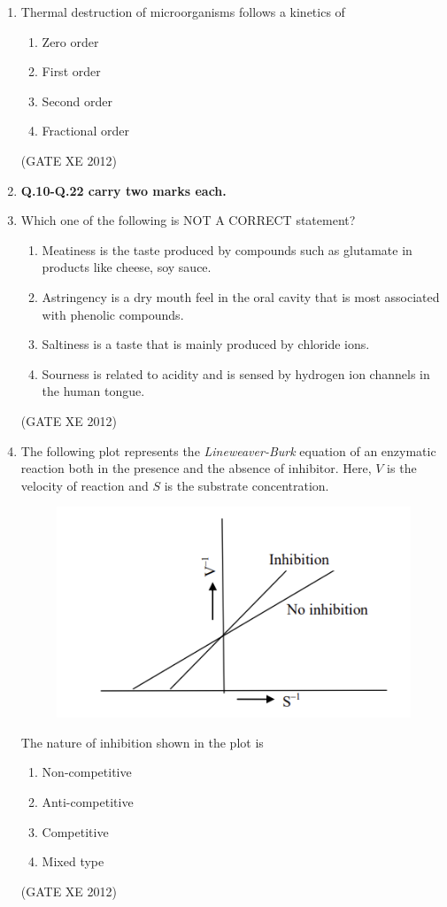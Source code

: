 \documentclass[12pt]{article}
\begin{document}
\begin{enumerate}
  \item Thermal destruction of microorganisms follows a kinetics of
  \begin{enumerate}
    \item Zero order
    \item First order
    \item Second order
    \item Fractional order
  \end{enumerate}
  (GATE XE 2012)

\item[] \textbf{Q.10-Q.22 carry two marks each.}

  \item Which one of the following is NOT A CORRECT statement?
\begin{enumerate}
    \item Meatiness is the taste produced by compounds such as glutamate in products like cheese, soy sauce. 
    \item Astringency is a dry mouth feel in the oral cavity that is most associated with phenolic compounds. 
    \item Saltiness is a taste that is mainly produced by chloride ions. 
    \item Sourness is related to acidity and is sensed by hydrogen ion channels in the human tongue.
\end{enumerate}
(GATE XE 2012)

\item The following plot represents the \textit{Lineweaver-Burk} equation of an enzymatic reaction both in the presence and the absence of inhibitor. Here, $V$ is the velocity of reaction and $S$ is the substrate concentration.  

\begin{figure}[H]
    \centering
    \caption{} \label{}
    \includegraphics[width=0.5\columnwidth]{figs/ass2_g_q11.png}
    \caption{}
    \label{fig:placeholder}
\end{figure}

The nature of inhibition shown in the plot is
\begin{enumerate}
    \item Non-competitive
    \item Anti-competitive
    \item Competitive
    \item Mixed type
\end{enumerate}
(GATE XE 2012)


\end{enumerate}
\end{document}
